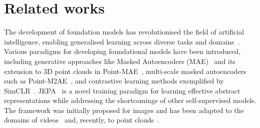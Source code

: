 \section{Related works}
\label{sec:relatedwork}
The development of foundation models has revolutionised the field of artificial intelligence, enabling generalised learning across diverse tasks and domains~\cite{bao2022beitbertpretrainingimage,DBLP:journals/corr/abs-2104-14294,kim2024openvlaopensourcevisionlanguageactionmodel,touvron2023llamaopenefficientfoundation}. Various paradigms for developing foundational models have been introduced, including generative approaches like Masked Autoencoders (MAE)~\cite{he2021maskedautoencodersscalablevision} and its extension to 3D point clouds in Point-MAE~\cite{pang2022maskedautoencoderspointcloud}, multi-scale masked autoencoders such as Point-M2AE~\cite{zhang2022pointm2aemultiscalemaskedautoencoders}, and contrastive learning methods exemplified by SimCLR~\cite{chen2020simpleframeworkcontrastivelearning}.  JEPA~\cite{assran2023self} is a novel training paradigm for learning effective abstract representations while addressing the shortcomings of other self-supervised models. The framework was initially proposed for images and has been adapted to the domains of videos~\citep{bardes2024revisiting} and, recently, to point clouds~\citep{saito2024point}. 

